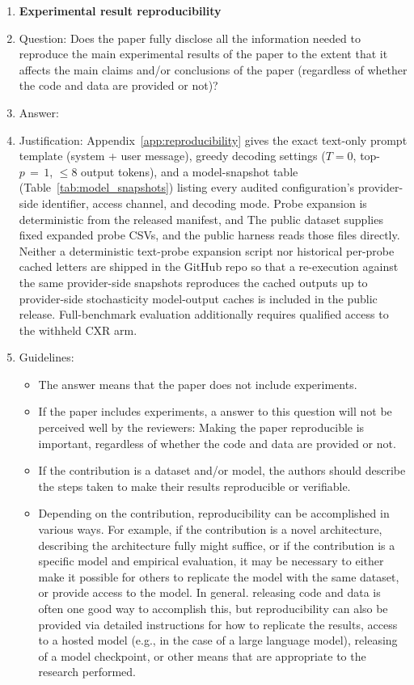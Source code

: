 \documentclass{article}
\providecommand{\DIFaddtex}[1]{{\protect\color{blue} \sf #1}} %
\providecommand{\DIFdeltex}[1]{{\protect\color{red} \scriptsize #1}} %
\providecommand{\DIFaddbegin}{} %
\providecommand{\DIFaddend}{} %
\providecommand{\DIFdelbegin}{} %
\providecommand{\DIFdelend}{} %
\providecommand{\DIFadd}[1]{\texorpdfstring{\DIFaddtex{#1}}{#1}} %
\providecommand{\DIFdel}[1]{\texorpdfstring{\DIFdeltex{#1}}{}} %
\begin{document}
\begin{enumerate}
\item {\bf Experimental result reproducibility}
    \item[] Question: Does the paper fully disclose all the information needed to reproduce the main experimental results of the paper to the extent that it affects the main claims and/or conclusions of the paper (regardless of whether the code and data are provided or not)?
    \item[] Answer: \answerYes{}
    \item[] Justification: Appendix~\ref{app:reproducibility} gives the exact text-only prompt template (system + user message), greedy decoding settings ($T{=}0$, top-$p\,{=}\,1$, $\le 8$ output tokens), and a model-snapshot table (Table~\ref{tab:model_snapshots}) listing every audited configuration's provider-side identifier, access channel, and decoding mode. \DIFdelbegin \DIFdel{Probe expansion is deterministic from the released manifest, and }\DIFdelend \DIFaddbegin \DIFadd{The public dataset supplies fixed expanded probe CSVs, and the public harness reads those files directly. Neither a deterministic text-probe expansion script nor historical }\DIFaddend per-probe \DIFdelbegin \DIFdel{cached letters are shipped in the GitHub repo so that a re-execution against the same provider-side snapshots reproduces the cached outputs up to provider-side stochasticity}\DIFdelend \DIFaddbegin \DIFadd{model-output caches is included in the public release. Full-benchmark evaluation additionally requires qualified access to the withheld CXR arm}\DIFaddend .
    \item[] Guidelines:
    \begin{itemize}
        \item The answer \answerNA{} means that the paper does not include experiments.
        \item If the paper includes experiments, a \answerNo{} answer to this question will not be perceived well by the reviewers: Making the paper reproducible is important, regardless of whether the code and data are provided or not.
        \item If the contribution is a dataset and\slash or model, the authors should describe the steps taken to make their results reproducible or verifiable.
        \item Depending on the contribution, reproducibility can be accomplished in various ways. For example, if the contribution is a novel architecture, describing the architecture fully might suffice, or if the contribution is a specific model and empirical evaluation, it may be necessary to either make it possible for others to replicate the model with the same dataset, or provide access to the model. In general. releasing code and data is often one good way to accomplish this, but reproducibility can also be provided via detailed instructions for how to replicate the results, access to a hosted model (e.g., in the case of a large language model), releasing of a model checkpoint, or other means that are appropriate to the research performed.

\end{itemize}
\end{enumerate}
\end{document}
